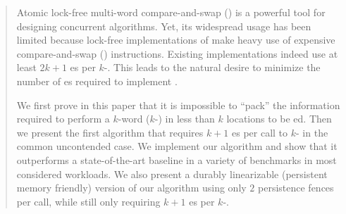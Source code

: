
\begin{abstract}
Atomic lock-free multi-word compare-and-swap (\mcas) is a powerful tool for designing concurrent algorithms. 
Yet, its widespread usage has been limited because lock-free implementations of \mcas{} make heavy use of expensive compare-and-swap (\cas) instructions. Existing \mcas{} implementations indeed use at least $2k+1$ \cas{}es per $k$-\cas{}. This leads to the natural desire to minimize the number of \cas{}es required to implement \mcas{}.

We first prove in this paper that it is impossible to ``pack'' the information required to perform a $k$-word \cas{} ($k$-\cas{}) in less than $k$ locations to be \cas{}ed. Then we present the first algorithm that requires $k+1$ \cas{}es per call to $k$-\cas{} in the common uncontended case. 
We implement our algorithm and show that it outperforms a state-of-the-art baseline 
in a variety of benchmarks in most considered workloads.
We also present a durably linearizable (persistent memory friendly) version of our \mcas{} algorithm using only $2$ persistence fences per call, while still only requiring $k+1$ \cas{}es per $k$-\cas{}.

\end{abstract}



